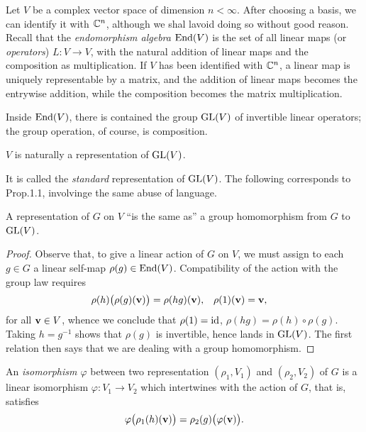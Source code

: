 \begin{example}
  Let \(V\) be a complex vector space of dimension \(n<\infty\). After
  choosing a basis, we can identify it with \(\mathbb{C}^n\), although we shal
  lavoid doing so without good reason. Recall that the \emph{endomorphism
    algebra \(\operatorname{End}(V)\)} is the set of all linear maps (or \emph{operators})
  \(L\colon V\to V\), with the natural addition of linear maps and the
  composition as multiplication. If \(V\) has been identified with
  \(\mathbb{C}^n\), a linear map is uniquely representable by a matrix, and the
  addition of linear maps becomes the entrywise addition, while the
  composition becomes the matrix multiplication.

  Inside \(\operatorname{End}(V)\), there is contained the group \(\operatorname{GL}(V)\) of invertible
  linear operators; the group operation, of course, is composition.
\end{example}

\begin{proposition}
  \(V\) is naturally a representation of \(\operatorname{GL}(V)\).
\end{proposition}
It is called the \emph{standard} representation of \(\operatorname{GL}(V)\). The following
corresponds to Prop.\@ 1.1, involvinge the same abuse of language.

\begin{proposition}
  A representation of \(G\) on \(V\) ``is the same as'' a group
  homomorphism from \(G\) to \(\operatorname{GL}(V)\).
\end{proposition}
\begin{proof}
  Observe that, to give a linear action of \(G\) on \(V\), we must assign
  to each \(g\in G\) a linear self-map \(\rho(g)\in\operatorname{End}(V)\). Compatibility
  of the action with the group law requires
  \begin{align*}
    \rho(h)\bigl(\rho(g)(\mathbf{v})\bigr)&=\rho(hg)(\mathbf{v}),
    &\rho(1)(\mathbf{v})&=\mathbf{v},
  \end{align*}
  for all \(\mathbf{v}\in V\), whence we conclude that \(\rho(1)=\operatorname{id}\),
  \(\rho(hg)=\rho(h)\circ\rho(g)\). Taking \(h=g^{-1}\) shows that
  \(\rho(g)\) is invertible, hence lands in \(\operatorname{GL}(V)\). The first relation
  then says that we are dealing with a group homomorphism.
\end{proof}

\begin{definition}
  An \emph{isomorphism \(\varphi\)} between two representation
  \((\rho_1,V_1)\) and \((\rho_2,V_2)\) of \(G\) is a linear isomorphism
  \(\varphi\colon V_1\to V_2\) which intertwines with the action of \(G\),
  that is, satisfies
  \[
    \varphi\bigl(\rho_1(h)(\mathbf{v})\bigr)=\rho_2(g)\bigl(\varphi(\mathbf{v})\bigr).
  \]
\end{definition}

